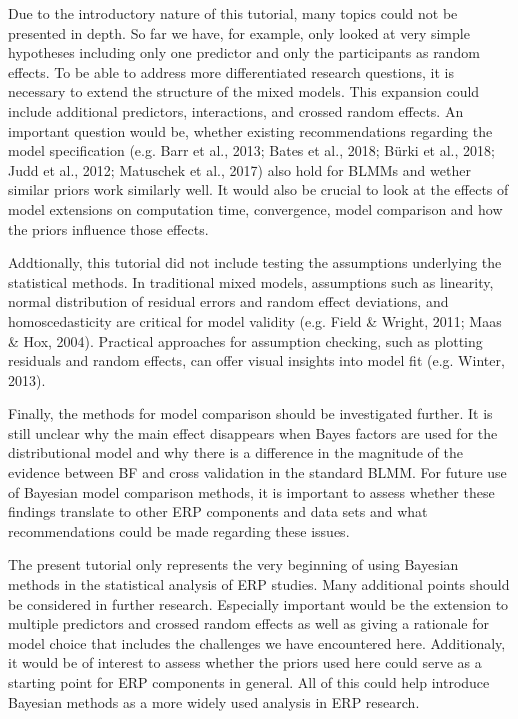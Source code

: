 \documentclass[
  doc,12pt,floatsintext]{apa7}
\begin{document}
Due to the introductory nature of this tutorial, many topics could not be presented in depth. So far we have, for example, only looked at very simple hypotheses including only one predictor and only the participants as random effects. To be able to address more differentiated research questions, it is necessary to extend the structure of the mixed models. This expansion could include additional predictors, interactions, and crossed random effects. An important question would be, whether existing recommendations regarding the model specification (e.g. Barr et al., 2013; Bates et al., 2018; Bürki et al., 2018; Judd et al., 2012; Matuschek et al., 2017) also hold for BLMMs and wether similar priors work similarly well. It would also be crucial to look at the effects of model extensions on computation time, convergence, model comparison and how the priors influence those effects.

Addtionally, this tutorial did not include testing the assumptions underlying the statistical methods. In traditional mixed models, assumptions such as linearity, normal distribution of residual errors and random effect deviations, and homoscedasticity are critical for model validity (e.g. Field \& Wright, 2011; Maas \& Hox, 2004). Practical approaches for assumption checking, such as plotting residuals and random effects, can offer visual insights into model fit (e.g. Winter, 2013).

Finally, the methods for model comparison should be investigated further. It is still unclear why the main effect disappears when Bayes factors are used for the distributional model and why there is a difference in the magnitude of the evidence between BF and cross validation in the standard BLMM. For future use of Bayesian model comparison methods, it is important to assess whether these findings translate to other ERP components and data sets and what recommendations could be made regarding these issues.

The present tutorial only represents the very beginning of using Bayesian methods in the statistical analysis of ERP studies. Many additional points should be considered in further research. Especially important would be the extension to multiple predictors and crossed random effects as well as giving a rationale for model choice that includes the challenges we have encountered here. Additionaly, it would be of interest to assess whether the priors used here could serve as a starting point for ERP components in general. All of this could help introduce Bayesian methods as a more widely used analysis in ERP research.
\end{document}

